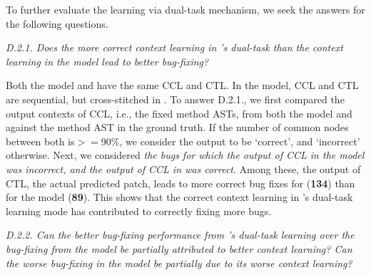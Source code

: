 To further evaluate the learning via dual-task
mechanism, we  seek the answers for the following questions.



{\em D.2.1. Does the more correct context learning in {\tool}'s
  dual-task than the context learning in the
   model lead to better bug-fixing?}

Both the  model and {\tool} have the same CCL and
CTL. In the  model, CCL and CTL are sequential, but
cross-stitched in {\tool}. To answer D.2.1., we first compared the
output contexts of CCL, i.e., the fixed method ASTs, from both the
 model and {\tool} against the method AST in the
ground truth. If the number of common nodes between both is$>=$90\%,
we consider the output to be `correct', and `incorrect'
otherwise. Next, we considered {\em the bugs for which the output of
  CCL in the  model was incorrect, and the output of
  CCL in {\tool} was correct}. Among these, the output of CTL, the
actual predicted patch, leads to more correct bug fixes for {\tool}
({\bf 134}) than for the  model ({\bf 89}). This shows
that the correct context learning in {\tool}'s dual-task learning
mode has contributed to correctly fixing more bugs.


{\em D.2.2. Can the better bug-fixing performance from {\tool}'s
  dual-task learning over the bug-fixing from the 
  model be partially attributed to better context learning? Can the
  worse bug-fixing in the  model be partially due to
  its worse context learning?}


